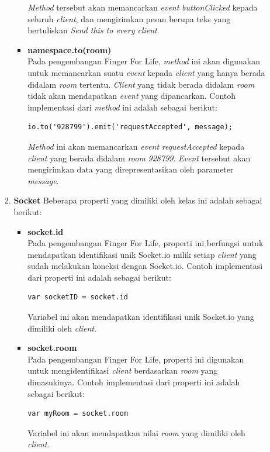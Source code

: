 \begin{enumerate}
\begin{enumerate}
\begin{enumerate}
\begin{itemize}
				\textit{Method} tersebut akan memancarkan \textit{event} \textit{buttonClicked} kepada seluruh \textit{client}, dan mengirimkan pesan berupa teks yang bertuliskan \textit{Send this to every client}.
				
				\item \textbf{namespace.to(room)} \\
				Pada pengembangan Finger For Life, \textit{method} ini akan digunakan untuk memancarkan suatu \textit{event} kepada \textit{client} yang hanya berada didalam \textit{room} tertentu. \textit{Client} yang tidak berada didalam \textit{room} tidak akan mendapatkan \textit{event} yang dipancarkan. Contoh implementasi dari \textit{method} ini adalah sebagai berikut:

\begin{lstlisting}
io.to('928799').emit('requestAccepted', message);
\end{lstlisting}
				\textit{Method} ini akan memancarkan \textit{event} \textit{requestAccepted} kepada \textit{client} yang berada didalam \textit{room} \textit{928799}. \textit{Event} tersebut akan mengirimkan data yang direpresentasikan oleh parameter \textit{message}.

			\end{itemize}
		
			\item \textbf{Socket}
			Beberapa properti yang dimiliki oleh kelas ini adalah sebagai berikut:
			\begin{itemize}
				\item \textbf{socket.id} \\
				Pada pengembangan Finger For Life, properti ini berfungsi untuk mendapatkan identifikasi unik Socket.io milik setiap \textit{client} yang sudah melakukan koneksi dengan Socket.io. Contoh implementasi dari properti ini adalah sebagai berikut:
\begin{lstlisting}
var socketID = socket.id
\end{lstlisting}
				Variabel ini akan mendapatkan identifikasi unik Socket.io yang dimiliki oleh \textit{client}. 
				
				\item \textbf{socket.room} \\
				Pada pengembangan Finger For Life, properti ini digunakan untuk mengidentifikasi \textit{client} berdasarkan \textit{room} yang dimasukinya. Contoh implementasi dari properti ini adalah sebagai berikut:
\begin{lstlisting}
var myRoom = socket.room
\end{lstlisting}
				Variabel ini akan mendapatkan nilai \textit{room} yang dimiliki oleh \textit{client}.


\end{itemize}
\end{enumerate}
\end{enumerate}
\end{enumerate}
